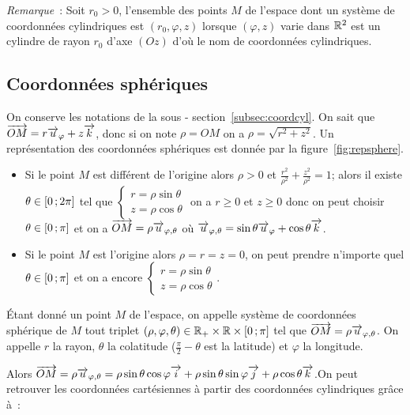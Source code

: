 \emph{Remarque}~: Soit \(r_0>0\), l'ensemble des points \(M\) de l'espace dont 
un système de coordonnées cylindriques est \((r_0, \varphi, z)\) lorsque 
\((\varphi, z)\) varie dans \(\mathbb{R}^2\) est un cylindre de rayon \(r_0\) d'axe 
\((Oz)\) d'où le nom de coordonnées cylindriques.

\subsection{Coordonnées sphériques}
On conserve les notations de la sous - section~\ref{subsec:coordcyl}. On sait 
que \(\overrightarrow{OM} = r\overrightarrow{u}_\varphi + z\overrightarrow{k}\), donc si on note \(\rho = OM\) on a 
\(\rho = \sqrt{r^2 + z^2}\). Un représentation des coordonnées sphériques est 
donnée par la figure~\ref{fig:repsphere}.

\begin{itemize}
  \item Si le point \(M\) est différent de l'origine alors \(\rho>0\) et 
    \(\frac{r^2}{\rho^2} + \frac{z^2}{\rho^2} = 1\); alors il existe \(\theta\in 
    \left[ 0 \, ;  2\pi \right]\) tel que \(\begin{cases} r = \rho\sin\theta \\ z = 
    \rho\cos\theta \end{cases}\) on a \(r\geqslant 0\) et \(z\geqslant 0\) donc 
    on peut choisir \(\theta\in \left[ 0 \, ;  \pi \right]\) et on a
    \(\overrightarrow{OM} = \rho\overrightarrow{u}_{\varphi, \theta}\) où \(\overrightarrow{u}_{\varphi, \theta} = 
    \sin\theta\overrightarrow{u}_\varphi + \cos\theta\overrightarrow{k}\).
  \item Si le point \(M\) est l'origine alors \(\rho = r = z = 0\), on peut 
    prendre n'importe quel \(\theta \in \left[ 0 \, ;  \pi \right]\) et on a encore 
    \(\begin{cases} r = \rho\sin\theta \\ z = \rho\cos\theta \end{cases}\).
\end{itemize}

\begin{defdef}
  Étant donné un point \(M\) de l'espace, on appelle système de coordonnées 
  sphérique de \(M\) tout triplet \((\rho, \varphi, \theta)\in\mathbb{R}_{+} \times \mathbb{R} 
  \times \left[ 0 \, ;  \pi \right]\) tel que \(\overrightarrow{OM} = \rho\overrightarrow{u}_{\varphi, 
  \theta}\).  On appelle \(r\) la rayon, \(\theta\) la colatitude 
  (\(\frac{\pi}{2}-\theta\) est la latitude) et \(\varphi\) la longitude.
\end{defdef}
Alors \(\overrightarrow{OM} = \rho\overrightarrow{u}_{\varphi, \theta} = \rho\sin\theta\cos\varphi\overrightarrow{i} + 
\rho\sin\theta\sin\varphi\overrightarrow{j} + \rho\cos\theta\overrightarrow{k}\).On peut retrouver les 
coordonnées cartésiennes à partir des coordonnées cylindriques grâce à~:

